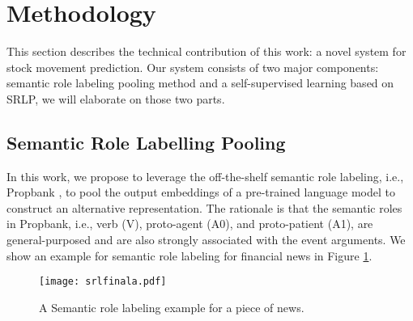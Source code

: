 \documentclass{article}
\begin{document}
\section{Methodology}
This section describes the technical contribution of this work: a novel system for stock movement prediction. Our system consists of two major components: semantic role labeling pooling method and a self-supervised learning based on SRLP, we will elaborate on those two parts. 




\begin{figure*}[t]
\begin{center}
\end{center}
\caption{\label{zero} Overall framework of our approach, including a domain adapted pre-trained model (RoBERTa WWM Ext), Semantic Roles Pooling, transformer layer, self-supervised module (left part), and the supervised module (right part). The green arrow represents a duplicate for the SRLP. The final result is generated from the stock movement classifier, and the total loss is obtained from the self-supervised SRLP part and supervised stock movement classification part.}
\label{yyds}
\end{figure*}



\subsection{Semantic Role Labelling Pooling}
In this work, we propose to leverage the off-the-shelf semantic role labeling, i.e., Propbank \cite{kingsbury2003propbank}, to pool the output embeddings of a pre-trained language model to construct an alternative representation. The rationale is that the semantic roles in Propbank, i.e., verb (V), proto-agent (A0), and proto-patient (A1), are general-purposed and are also strongly associated with the event arguments. We show an example for semantic role labeling for financial news in Figure \ref{srlexample}.

\begin{figure}[H]
\begin{center}  
   \texttt{[image: srlfinala.pdf]}
\end{center}
\caption{A Semantic role labeling example for a piece of news.}
\label{srlexample}
\end{figure}
\end{document}
